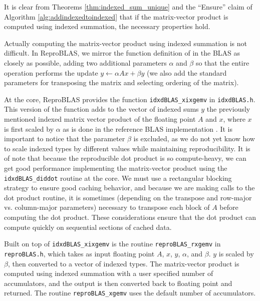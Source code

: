  It is clear from Theorems \ref{thm:indexed_sum_unique} and the ``Ensure'' claim of Algorithm \ref{alg:addindexedtoindexed} that if the matrix-vector product is computed using indexed summation, the necessary properties hold.

  Actually computing the matrix-vector product using indexed summation is not difficult. In ReproBLAS, we mirror the function definition of  in the BLAS as closely as possible, adding two additional parameters $\alpha$ and $\beta$ so that the entire operation performs the update $y \gets \alpha Ax + \beta y$ (we also add the standard parameters for transposing the matrix and selecting ordering of the matrix).

  At the core, ReproBLAS provides the function \texttt{idxdBLAS\_xixgemv} in \texttt{idxdBLAS.h}. This version of the function adds to the vector of indexed sums $y$ the previously mentioned indexed matrix vector product of the floating point $A$ and $x$, where $x$ is first scaled by $\alpha$ as is done in the reference BLAS implementation \cite{BLAS}. It is important to notice that the parameter $\beta$ is excluded, as we do not yet know how to scale indexed types by different values while maintaining reproducibility.
  It is of note that because the reproducible dot product is so compute-heavy, we can get good performance implementing the matrix-vector product using the \texttt{idxdBLAS\_diddot} routine at the core. We must use a rectangular blocking strategy to ensure good caching behavior, and because we are making calls to the dot product routine, it is sometimes (depending on the transpose and row-major vs. column-major parameters) necessary to transpose each block of $A$ before computing the dot product. These considerations ensure that the dot product can compute quickly on sequential sections of cached data.

  Built on top of \texttt{idxdBLAS\_xixgemv} is the routine \texttt{reproBLAS\_rxgemv} in \texttt{reproBLAS.h}, which takes as input floating point $A$, $x$, $y$, $\alpha$, and $\beta$. $y$ is scaled by $\beta$, then converted to a vector of indexed types. The matrix-vector product is computed using indexed summation with a user specified number of accumulators, and the output is then converted back to floating point and returned. The routine \texttt{reproBLAS\_xgemv} uses the default number of accumulators.
